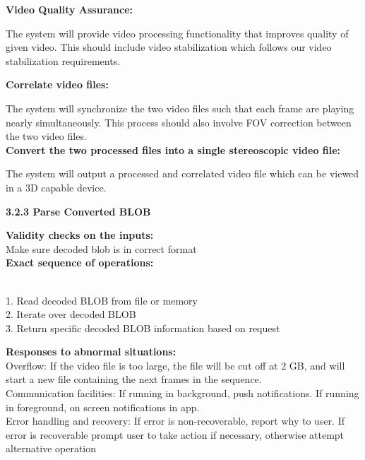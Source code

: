 \documentclass[10pt,draftclsnofoot,onecolumn]{IEEEtran}
\begin{document}
\textbf{Video Quality Assurance: }\\
 \vspace{5mm}

The system will provide video processing functionality that improves quality of given video. This should include video stabilization which follows our video stabilization requirements. \\
\vspace{5mm}

\textbf{Correlate video files: }\\
 \vspace{5mm}

The system will synchronize the two video files such that each frame are playing nearly simultaneously. This process should also involve FOV correction between the two video files. \\
\vspace{5mm}
\textbf{Convert the two processed files into a single stereoscopic video file: }\\
 \vspace{5mm}

The system will output a processed and correlated video file which can be viewed in a 3D capable device. \\
\vspace{5mm}

{\Medium\textbf{3.2.3 Parse Converted BLOB}} \\
\vspace{5mm}

 
 \textbf{Validity checks on the inputs:}\\
  \vspace{5mm}
Make sure decoded blob is in correct format\\
 \vspace{5mm}
\textbf{Exact sequence of operations: }\\\\
 \vspace{5mm}

1. Read decoded BLOB from file or memory\\
2. Iterate over decoded BLOB\\
3. Return specific decoded BLOB information based on request\\

 \vspace{5mm}

\textbf{Responses to abnormal situations:}\\
 \vspace{5mm}
 Overflow: If the video file is too large, the file will be cut off at 2 GB, and will start a new file containing the next frames in the sequence. \\
 Communication facilities: If running in background, push notifications. If running in foreground, on screen notifications in app. \\
 Error handling and recovery: If error is non-recoverable, report why to user. If error is recoverable prompt user to take action if necessary, otherwise attempt alternative operation
\end{document}
